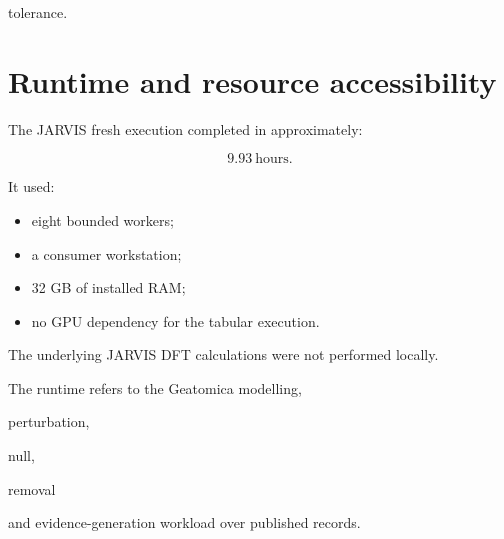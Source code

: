 \documentclass[11pt,a4paper,oneside]{report}
\begin{document}
tolerance.





\section{Runtime and resource accessibility}



The JARVIS fresh execution completed in approximately:



\begin{equation}
9.93
\ \mathrm{hours}.
\end{equation}



It used:



\begin{itemize}



\item

eight bounded workers;



\item

a consumer workstation;



\item

32 GB of installed RAM;



\item

no GPU dependency for the tabular execution.



\end{itemize}



The underlying JARVIS DFT calculations were not performed locally.



The runtime refers to the Geatomica modelling,

perturbation,

null,

removal

and evidence-generation workload over published records.
\end{document}
